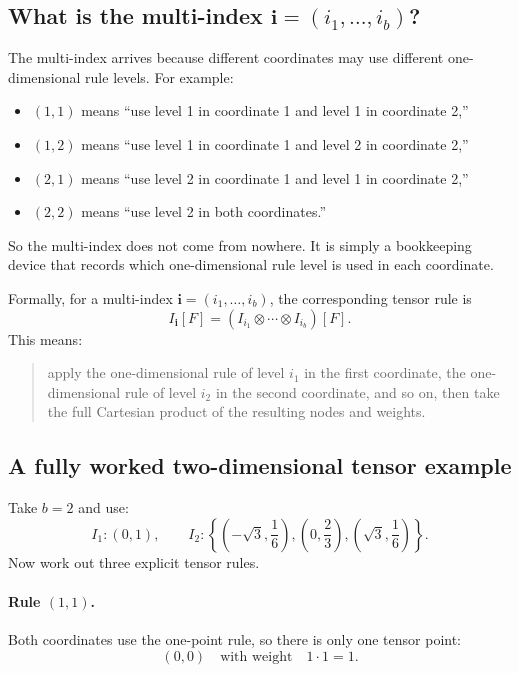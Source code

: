 \documentclass[11pt]{article}
\numberwithin{equation}{section}
\begin{document}
\subsection{What is the multi-index \texorpdfstring{\(\mathbf i=(i_1,\ldots,i_b)\)}{i=(i1,...,ib)}?}

The multi-index arrives because different coordinates may use different
one-dimensional rule levels.  For example:
\begin{itemize}[leftmargin=0.28in]
  \item \((1,1)\) means ``use level 1 in coordinate 1 and level 1 in coordinate
  2,''
  \item \((1,2)\) means ``use level 1 in coordinate 1 and level 2 in coordinate
  2,''
  \item \((2,1)\) means ``use level 2 in coordinate 1 and level 1 in coordinate
  2,''
  \item \((2,2)\) means ``use level 2 in both coordinates.''
\end{itemize}
So the multi-index does not come from nowhere.  It is simply a bookkeeping device
that records which one-dimensional rule level is used in each coordinate.

Formally, for a multi-index \(\mathbf i=(i_1,\ldots,i_b)\), the corresponding
tensor rule is
\begin{equation}
  I_{\mathbf i}[F]
  =
  (I_{i_1}\otimes\cdots\otimes I_{i_b})[F].
  \label{eq:p31-tensor-rule}
\end{equation}
This means:
\begin{quote}
apply the one-dimensional rule of level \(i_1\) in the first coordinate, the
one-dimensional rule of level \(i_2\) in the second coordinate, and so on, then
take the full Cartesian product of the resulting nodes and weights.
\end{quote}

\subsection{A fully worked two-dimensional tensor example}

Take \(b=2\) and use:
\begin{equation}
  I_1:(0,1),
  \qquad
  I_2:\left\{\left(-\sqrt3,\frac16\right),\left(0,\frac23\right),
  \left(\sqrt3,\frac16\right)\right\}.
  \label{eq:p36-level1-level2-rules}
\end{equation}
Now work out three explicit tensor rules.

\paragraph{Rule \texorpdfstring{\((1,1)\)}{(1,1)}.}
Both coordinates use the one-point rule, so there is only one tensor point:
\begin{equation}
  (0,0)
  \quad\text{with weight}\quad 1\cdot 1 = 1.
  \label{eq:p36-rule-11}
\end{equation}
\end{document}
